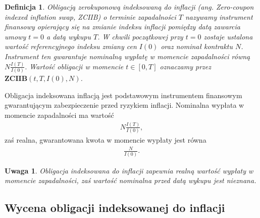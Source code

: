 \documentclass{mini}
\theoremstyle{mythstyle}
\newtheorem{Definicja}{Definicja}[chapter]
\newtheorem{Uwaga}{Uwaga}[chapter]
\begin{document}
	\begin{Definicja}
		Obligacją zerokuponową indeksowaną do inflacji (ang. Zero-coupon indexed inflation swap, ZCIIB) o terminie zapadalności $T$ nazywamy instrument finansowy opierający się na zmianie indeksu inflacji pomiędzy datą zawarcia umowy $t = 0$ a datą wykupu $T$. W chwili początkowej przy $t = 0$  zostaje ustalona wartość referencyjnego indeksu zmiany cen $I(0)$ oraz nominał kontraktu $N$. Instrument ten gwarantuje nominalną wypłatę w momencie zapadalności równą $N\frac{I(T)}{I(0)}.$ Wartość obligacji w momencie $t \in [0,T]$ oznaczamy przez $\mathbf{ZCIIB}(t,T,I(0),N)$.
	\end{Definicja}

	Obligacja indeksowana inflacją jest podstawowym instrumentem finansowym gwarantującym zabezpieczenie przed ryzykiem inflacji. Nominalna wypłata w momencie zapadalności ma wartość
	\begin{eqnarray}
		N\frac{I(T)}{I(0)},
	\end{eqnarray}
	zaś realna, gwarantowana kwota w momencie wypłaty jest równa
	\begin{eqnarray}
		 \frac{N}{I(0)}.
	 \end{eqnarray}
 
	 \begin{Uwaga}
		 Obligacja indeksowana do inflacji zapewnia realną wartość wypłaty w momencie zapadalności, zaś wartość nominalna przed datą wykupu jest nieznana.
	 \end{Uwaga}
		
	\subsection*{Wycena obligacji indeksowanej do inflacji}
	
\end{document}
